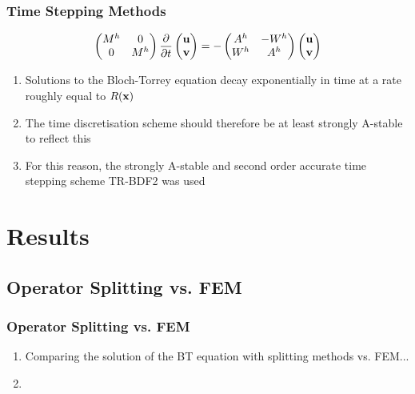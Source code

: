 \begin{frame}
\frametitle{Time Stepping Methods}
\begin{align*}
    \begin{pmatrix}
    M^h & 0 \\ 
    0 & M^h
    \end{pmatrix}
    \frac{\partial }{\partial t}
    \begin{pmatrix} \mathbf{u} \\ \mathbf{v} \end{pmatrix}
    = -
    \begin{pmatrix}
    A^h & -W^h \\ 
    W^h & A^h
    \end{pmatrix}
    \begin{pmatrix} \mathbf{u} \\ \mathbf{v} \end{pmatrix}
\end{align*}
\begin{enumerate}
    \item Solutions to the Bloch-Torrey equation decay exponentially in time at a rate roughly equal to $R(\mathbf{x})$
    \item The time discretisation scheme should therefore be at least strongly A-stable to reflect this
    \item For this reason, the strongly A-stable and second order accurate time stepping scheme \textsc{TR-BDF2} was used
\end{enumerate}
\end{frame}


\section{Results}

\subsection{Operator Splitting vs. FEM}

\begin{frame}
\frametitle{Operator Splitting vs. FEM}
\begin{enumerate}
    \item Comparing the solution of the BT equation with splitting methods vs. FEM...
    \item {} %
\end{enumerate}
\end{frame}


